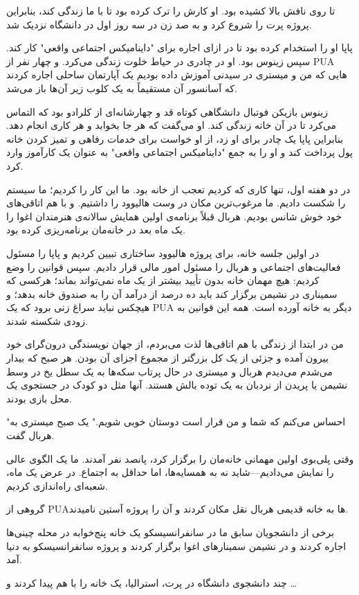 \noindent
تا روی نافش بالا کشیده بود. او کارش را ترک کرده بود تا با ما زندگی کند، بنابراین پروژه پرت را شروع کرد و به صد زن در سه روز اول در دانشگاه نزدیک شد.

\bigskip

\noindent
پاپا او را استخدام کرده بود تا در ازای اجاره برای "داینامیکس اجتماعی واقعی" کار کند. سپس زینوس بود. او در چادری در حیاط خلوت زندگی می‌کرد. و چهار نفر از PUA هایی که من و میستری در سیدنی آموزش داده بودیم یک آپارتمان ساحلی اجاره کردند که آسانسور آن مستقیماً به یک کلوب زیر آن‌ها باز می‌شد. 

\bigskip

\noindent
زینوس بازیکن فوتبال دانشگاهی کوتاه قد و چهارشانه‌ای از کلرادو بود که التماس می‌کرد تا در آن خانه زندگی کند. او می‌گفت که هر جا بخوابد و هر کاری انجام دهد. بنابراین پاپا یک چادر برای او زد، از او خواست برای خدمات رفاهی و تمیز کردن خانه پول پرداخت کند و او را به جمع "داینامیکس اجتماعی واقعی" به عنوان یک کارآموز وارد کرد.

\bigskip

\noindent
در دو هفته اول، تنها کاری که کردیم تعجب از خانه بود. ما این کار را کردیم؛ ما سیستم را شکست دادیم. ما مرغوب‌ترین مکان در وست هالیوود را داشتیم. و با هم اتاقی‌های خود خوش شانس بودیم. هربال قبلاً برنامه‌ی اولین همایش سالانه‌ی هنرمندان اغوا را یک ماه بعد در خانه‌مان برنامه‌ریزی کرده بود.

\bigskip

\noindent
در اولین جلسه‌ خانه، برای پروژه ‌هالیوود ساختاری تبیین کردیم و پاپا را مسئول فعالیت‌های اجتماعی و هربال را مسئول امور مالی قرار دادیم. سپس قوانین را وضع کردیم: هیچ مهمان خانه بدون تأیید بیشتر از یک ماه نمی‌تواند بماند؛ هرکسی که سمیناری در نشیمن برگزار کند باید ده درصد از درآمد آن را به صندوق خانه بدهد؛ و هیچکس نباید سراغ زنی برود که یک PUA دیگر به خانه‌ آورده است. همه این قوانین به زودی شکسته شدند.

\bigskip

\noindent
من در ابتدا از زندگی با هم اتاقی‌ها لذت می‌بردم، از جهان نویسندگی درون‌گرای خود بیرون آمده و جزئی از یک کل بزرگتر از مجموع اجزای آن بودن. هر صبح که بیدار می‌شدم می‌دیدم هربال و میستری در حال پرتاب سکه‌ها به یک سطل یخ در وسط نشیمن یا پریدن از نردبان به یک توده بالش هستند. آنها مثل دو کودک در جستجوی یک محل بازی بودند.

\bigskip

\noindent
"احساس می‌کنم که شما و من قرار است دوستان خوبی شویم." یک صبح میستری به هربال گفت.

\bigskip

\noindent
وقتی پلی‌بوی اولین مهمانی خانه‌مان را برگزار کرد، پانصد نفر آمدند. ما یک الگوی عالی را نمایش می‌دادیم—شاید نه به همسایه‌ها، اما حداقل به اجتماع. در عرض یک ماه، شعبه‌ای راه‌اندازی کردیم.

\bigskip

\noindent
گروهی از PUAها به خانه قدیمی هربال نقل مکان کردند و آن را پروژه آستین نامیدند.

\bigskip

\noindent
برخی از دانشجویان سابق ما در سانفرانسیسکو یک خانه پنج‌خوابه در محله چینی‌ها اجاره کردند و در نشیمن سمینارهای اغوا برگزار کردند و پروژه سانفرانسیسکو به دنیا آمد.

\bigskip

\noindent
چند دانشجوی دانشگاه در پرت، استرالیا، یک خانه را با هم پیدا کردند و \ldots